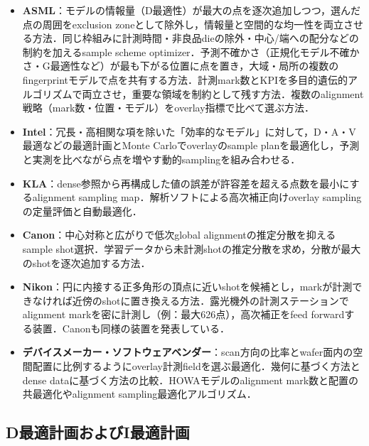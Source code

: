 \documentclass[10.5pt,a4paper]{ltjsarticle}
\begin{document}
\begin{itemize}
  \item \textbf{ASML}：モデルの情報量（D最適性）が最大の点を逐次追加しつつ，選んだ点の周囲をexclusion zoneとして除外し，情報量と空間的な均一性を両立させる方法\cite{us20160334717}．同じ枠組みに計測時間・非良品dieの除外・中心/端への配分などの制約を加えるsample scheme optimizer\cite{us20160299438}．予測不確かさ（正規化モデル不確かさ・G最適性など）が最も下がる位置に点を置き，大域・局所の複数のfingerprintモデルで点を共有する方法\cite{wo2020234028}．計測mark数とKPIを多目的遺伝的アルゴリズムで両立させ，重要な領域を制約として残す方法\cite{us11775728}．複数のalignment戦略（mark数・位置・モデル）をoverlay指標で比べて選ぶ方法\cite{us7042552}．
  \item \textbf{Intel}：冗長・高相関な項を除いた「効率的なモデル」に対して，D・A・V最適などの最適計画とMonte Carloでoverlayのsample planを最適化し，予測と実測を比べながら点を増やす動的samplingを組み合わせる\cite{us7197722,us7571420}．
  \item \textbf{KLA}：dense参照から再構成した値の誤差が許容差を超える点数を最小にするalignment sampling map\cite{us10692227}．解析ソフトによる高次補正向けoverlay samplingの定量評価と自動最適化\cite{koay2010}．
  \item \textbf{Canon}：中心対称と広がりで低次global alignmentの推定分散を抑えるsample shot選択\cite{us4918320}．学習データから未計測shotの推定分散を求め，分散が最大のshotを逐次追加する方法\cite{us12025924}．
  \item \textbf{Nikon}：円に内接する正多角形の頂点に近いshotを候補とし，markが計測できなければ近傍のshotに置き換える方法\cite{jph1019512}．露光機外の計測ステーションでalignment markを密に計測し（例：最大626点），高次補正をfeed forwardする装置\cite{nikon_litho_booster}．Canonも同様の装置を発表している\cite{canon_ms001}．
  \item \textbf{デバイスメーカー・ソフトウェアベンダー}：scan方向の比率とwafer面内の空間配置に比例するようにoverlay計測fieldを選ぶ最適化\cite{felix2011}．幾何に基づく方法とdense dataに基づく方法の比較\cite{lee2016}．HOWAモデルのalignment mark数と配置の共最適化\cite{chiu2022a}やalignment sampling最適化アルゴリズム\cite{chiu2022b}．
\end{itemize}

\subsection{D最適計画およびI最適計画}
\label{sec:doe}
\end{document}
